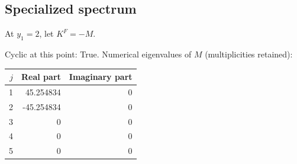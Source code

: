 \documentclass[10pt,a4paper]{article}
\newcommand{\fitmath}[1]{\sbox{\mathbox}{$\displaystyle #1$}\ifdim\wd\mathbox>\linewidth\resizebox{\linewidth}{!}{\usebox{\mathbox}}\else\usebox{\mathbox}\fi}
\begin{document}
\subsection*{Specialized spectrum}
At $y_1=2$, let $K^F=-M$.
\begin{center}\fitmath{\Delta=1024}\end{center}
Cyclic at this point: True.
Numerical eigenvalues of $M$ (multiplicities retained):
\begin{center}\small\begin{tabular}{rrr}\toprule $j$ & Real part & Imaginary part\\\midrule
1 & 45.254834 & 0\\
2 & -45.254834 & 0\\
3 & 0 & 0\\
4 & 0 & 0\\
5 & 0 & 0\\
\bottomrule\end{tabular}\end{center}
\end{document}
